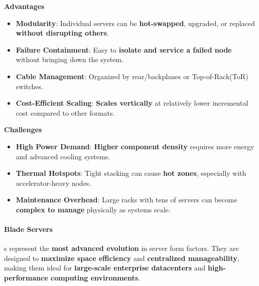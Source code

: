 \newpage

\begin{flushleft}
    \textcolor{Green3}{ \textbf{Advantages}}
\end{flushleft}
\begin{itemize}[label=\textcolor{Green3}{}]
    \item \textcolor{Green3}{\textbf{Modularity}}: Individual servers can be \textbf{hot-swapped}, upgraded, or replaced \textbf{without disrupting others}.
    \item \textcolor{Green3}{\textbf{Failure Containment}}: Easy to \textbf{isolate and service a failed node} without bringing down the system.
    \item \textcolor{Green3}{\textbf{Cable Management}}: Organized by rear/backplanes or Top-of-Rack\break (ToR) switches.
    \item \textcolor{Green3}{\textbf{Cost-Efficient Scaling}}: \textbf{Scales vertically} at relatively lower incremental cost compared to other formats.
\end{itemize}

\highspace
\begin{flushleft}
    \textcolor{Red2}{ \textbf{Challenges}}
\end{flushleft}
\begin{itemize}[label=\textcolor{Red2}{}]
    \item \textcolor{Red2}{\textbf{High Power Demand}}: \textbf{Higher component density} requires more energy and advanced cooling systems.
    \item \textcolor{Red2}{\textbf{Thermal Hotspots}}: Tight stacking can cause \textbf{hot zones}, especially with accelerator-heavy nodes.
    \item \textcolor{Red2}{\textbf{Maintenance Overhead}}: Large racks with tens of servers can become \textbf{complex to manage} physically as systems scale.
\end{itemize}

\newpage

\paragraph{Blade Servers}\label{paragraph: Blade Servers}

s represent the \textbf{most advanced evolution} in server form factors. They are designed to \textbf{maximize space efficiency} and \textbf{centralized manageability}, making them ideal for \textbf{large-scale enterprise datacenters} and \textbf{high-performance computing environments}.

